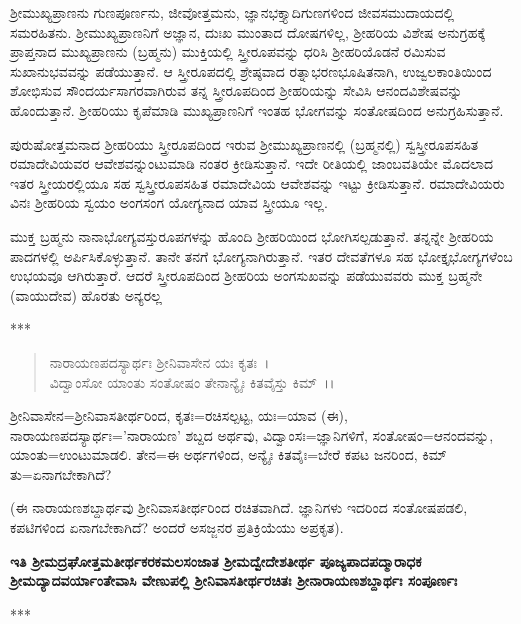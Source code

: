 
ಶ‍್ರೀಮುಖ್ಯಪ್ರಾಣನು ಗುಣಪೂರ್ಣನು, ಜೀವೋತ್ತಮನು, ಜ್ಞಾನಭಕ್ತ್ಯಾದಿಗುಣಗಳಿಂದ ಜೀವಸಮುದಾಯದಲ್ಲಿ ಸಮರಹಿತನು. ಶ‍್ರೀಮುಖ್ಯಪ್ರಾಣನಿಗೆ ಅಜ್ಞಾನ, ದುಃಖ ಮುಂತಾದ ದೋಷಗಳಿಲ್ಲ, ಶ‍್ರೀಹರಿಯ ವಿಶೇಷ ಅನುಗ್ರಹಕ್ಕೆ ಪ್ರಾಪ್ತನಾದ ಮುಖ್ಯಪ್ರಾಣನು (ಬ್ರಹ್ಮನು) ಮುಕ್ತಿಯಲ್ಲಿ ಸ್ತ್ರೀರೂಪವನ್ನು ಧರಿಸಿ ಶ‍್ರೀಹರಿಯೊಡನೆ ರಮಿಸುವ ಸುಖಾನುಭವವನ್ನು ಪಡೆಯುತ್ತಾನೆ. ಆ ಸ್ತ್ರೀರೂಪದಲ್ಲಿ ಶ್ರೇಷ್ಠವಾದ ರತ್ನಾಭರಣಭೂಷಿತನಾಗಿ, ಉಜ್ವಲಕಾಂತಿಯಿಂದ ಶೋಭಿಸುವ ಸೌಂದರ್ಯಸಾಗರವಾಗಿರುವ ತನ್ನ ಸ್ತ್ರೀರೂಪದಿಂದ ಶ‍್ರೀಹರಿಯನ್ನು ಸೇವಿಸಿ ಆನಂದವಿಶೇಷವನ್ನು ಹೊಂದುತ್ತಾನೆ. ಶ‍್ರೀಹರಿಯು ಕೃಪೆಮಾಡಿ ಮುಖ್ಯಪ್ರಾಣನಿಗೆ ಇಂತಹ ಭೋಗವನ್ನು ಸಂತೋಷದಿಂದ ಅನುಗ್ರಹಿಸುತ್ತಾನೆ.

ಪುರುಷೋತ್ತಮನಾದ ಶ‍್ರೀಹರಿಯು ಸ್ತ್ರೀರೂಪದಿಂದ ಇರುವ ಶ‍್ರೀಮುಖ್ಯಪ್ರಾಣನಲ್ಲಿ (ಬ್ರಹ್ಮನಲ್ಲಿ) ಸ್ವಸ್ತ್ರೀರೂಪಸಹಿತ ರಮಾದೇವಿಯವರ ಆವೇಶವನ್ನುಂಟುಮಾಡಿ ನಂತರ ಕ್ರೀಡಿಸುತ್ತಾನೆ. ಇದೇ ರೀತಿಯಲ್ಲಿ ಜಾಂಬವತಿಯೇ ಮೊದಲಾದ ಇತರ ಸ್ತ್ರೀಯರಲ್ಲಿಯೂ ಸಹ ಸ್ವಸ್ತ್ರೀರೂಪಸಹಿತ ರಮಾದೇವಿಯ ಆವೇಶವನ್ನು ಇಟ್ಟು ಕ್ರೀಡಿಸುತ್ತಾನೆ. ರಮಾದೇವಿಯರು ವಿನಃ ಶ‍್ರೀಹರಿಯ ಸ್ವಯಂ ಅಂಗಸಂಗ ಯೋಗ್ಯನಾದ ಯಾವ ಸ್ತ್ರೀಯೂ ಇಲ್ಲ.

ಮುಕ್ತ ಬ್ರಹ್ಮನು ನಾನಾಭೋಗ್ಯವಸ್ತುರೂಪಗಳನ್ನು ಹೊಂದಿ ಶ‍್ರೀಹರಿಯಿಂದ ಭೋಗಿಸಲ್ಪಡುತ್ತಾನೆ. ತನ್ನನ್ನೇ ಶ‍್ರೀಹರಿಯ ಪಾದಗಳಲ್ಲಿ ಅರ್ಪಿಸಿಕೊಳ್ಳುತ್ತಾನೆ. ತಾನೇ ತನಗೆ ಭೋಗ್ಯನಾಗಿರುತ್ತಾನೆ. ಇತರ ದೇವತೆಗಳೂ ಸಹ ಭೋಕ್ತೃಭೋಗ್ಯಗಳೆಂಬ ಉಭಯವೂ ಆಗಿರುತ್ತಾರೆ. ಆದರೆ ಸ್ತ್ರೀರೂಪದಿಂದ ಶ‍್ರೀಹರಿಯ ಅಂಗಸುಖವನ್ನು ಪಡೆಯುವವರು ಮುಕ್ತ ಬ್ರಹ್ಮನೇ (ವಾಯುದೇವ) ಹೊರತು ಅನ್ಯರಲ್ಲ

\begin{center}
***
\end{center}

\begin{verse}
ನಾರಾಯಣಪದಸ್ಯಾರ್ಥಃ ಶ‍್ರೀನಿವಾಸೇನ ಯಃ ಕೃತಃ~।\\ ವಿದ್ವಾಂಸೋ ಯಾಂತು ಸಂತೋಷಂ ತೇನಾನ್ಯೈಃ ಕಿತವೈಸ್ತು ಕಿಮ್~।।
\end{verse}

ಶ‍್ರೀನಿವಾಸೇನ=ಶ‍್ರೀನಿವಾಸತೀರ್ಥರಿಂದ, ಕೃತಃ=ರಚಿಸಲ್ಪಟ್ಟ, ಯಃ=ಯಾವ (ಈ), ನಾರಾಯಣಪದಸ್ಯಾರ್ಥಃ='ನಾರಾಯಣ' ಶಬ್ದದ ಅರ್ಥವು, ವಿದ್ವಾಂಸಃ=ಜ್ಞಾನಿಗಳಿಗೆ, ಸಂತೋಷಂ=ಆನಂದವನ್ನು, ಯಾಂತು=ಉಂಟುಮಾಡಲಿ. ತೇನ=ಈ ಅರ್ಥಗಳಿಂದ, ಅನ್ಯೈಃ ಕಿತವೈಃ=ಬೇರೆ ಕಪಟ ಜನರಿಂದ, ಕಿಮ್ ತು=ಏನಾಗಬೇಕಾಗಿದೆ?

(ಈ ನಾರಾಯಣಶಬ್ದಾರ್ಥವು ಶ‍್ರೀನಿವಾಸತೀರ್ಥರಿಂದ ರಚಿತವಾಗಿದೆ. ಜ್ಞಾನಿಗಳು ಇದರಿಂದ ಸಂತೋಷಪಡಲಿ, ಕಪಟಿಗಳಿಂದ ಏನಾಗಬೇಕಾಗಿದೆ? ಅಂದರೆ ಅಸಜ್ಜನರ ಪ್ರತಿಕ್ರಿಯೆಯು ಅಪ್ರಕೃತ).

\begin{center}
\textbf{ಇತಿ ಶ‍್ರೀಮದ್ರಘೋತ್ತಮತೀರ್ಥಕರಕಮಲಸಂಜಾತ ಶ‍್ರೀಮದ್ವೇದೇಶತೀರ್ಥ ಪೂಜ್ಯಪಾದಪದ್ಮಾರಾಧಕ ಶ‍್ರೀಮದ್ಯಾದವರ್ಯಾಂತೇವಾಸಿ ವೇಣುಪಲ್ಲಿ ಶ‍್ರೀನಿವಾಸತೀರ್ಥರಚಿತಃ ಶ‍್ರೀನಾರಾಯಣಶಬ್ದಾರ್ಥಃ ಸಂಪೂರ್ಣಃ}
\end{center}

\begin{center}
***
\end{center}

